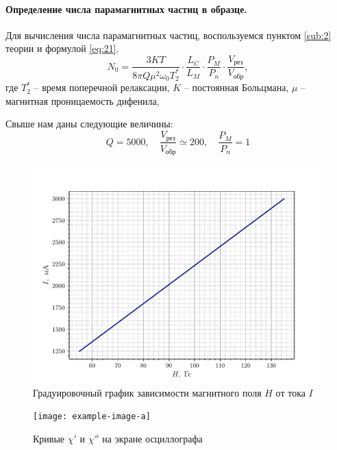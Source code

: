 \paragraph{Определение числа парамагнитных частиц в образце.}%
Для вычисления числа парамагнитных частиц, воспользуемся пунктом \ref{sub:2} теории и формулой \eqref{eq:21}.
\begin{equation}
    \label{eq:21a}
    N_0 = \frac{3KT}{8 \pi Q \mu^2 \omega_0 T^*_2} \cdot \frac{L_C}{L_M} \cdot \frac{P_M}{P_n} \cdot \frac{V_{\text{рез}}}{V_{\text{обр}}},
\end{equation}
где $T_2^*$ -- время поперечной релаксации,  $K$ -- постоянная Больцмана,  $\mu$ -- магнитная проницаемость дифенила,

Свыше нам даны следующие величины:
\begin{equation}
    \label{eq:}
    Q = 5000, \quad \frac{V_{\text{рез}}}{V_{\text{обр}}} \simeq 200, \quad \frac{P_M}{P_n} = 1
\end{equation}



\begin{figure}[h!]
    \centering
    \includegraphics[scale=1]{fig/fig1}
    \caption{Градуировочный график зависимости магнитного поля $H$ от тока $I$}
    \label{fig:1}
\end{figure}

\begin{figure}[h!]
    \centering
    \texttt{[image: example-image-a]}
    \caption{Кривые $\chi'$ и  $\chi''$ на экране осциллографа}
    \label{fig:2}
\end{figure}



